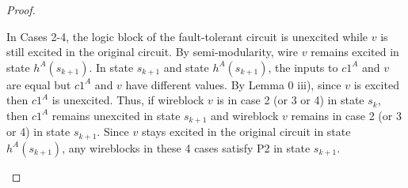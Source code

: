 \documentclass[12pt]{report}
\begin{document}
\begin{proof}
\begin{itemize}
\begin{itemize}
In Cases 2-4, the logic block of the fault-tolerant circuit is unexcited while $v$ is still excited in the original circuit.  By semi-modularity, wire $v$ remains excited in state $h^A(s_{k+1})$.  In state $s_{k+1}$ and state $h^A(s_{k+1})$, the inputs to $c1^A$ and $v$ are equal but $c1^A$ and $v$ have different values.  By Lemma 0 iii), since $v$ is excited then $c1^A$ is unexcited.  Thus, if wireblock $v$ is in case 2 (or 3 or 4) in state $s_k$, then $c1^A$ remains unexcited in state $s_{k+1}$ and wireblock $v$ remains in case 2 (or 3 or 4) in state $s_{k+1}$.  
Since $v$ stays excited in the original circuit in state $h^A(s_{k+1})$, any wireblocks in these 4 cases satisfy P2 in state $s_{k+1}$.




\end{itemize}
\end{itemize}
\end{proof}
\end{document}
